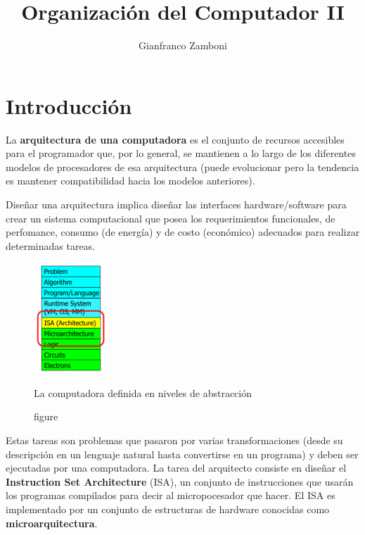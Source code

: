 



\title{Organización del Computador II}
\author{Gianfranco Zamboni}



\newcommand{\red}[1]{{\color{red}#1}}  			%


	\maketitle
	\tableofcontents

\newpage
\section{Introducción}

La \textbf{arquitectura de una computadora} es el conjunto de recursos accesibles para el programador que, por lo general, se mantienen a lo largo de los diferentes modelos de procesadores de esa arquitectura (puede evolucionar pero la tendencia es mantener compatibilidad hacia los modelos anteriores).

Diseñar una arquitectura implica diseñar las interfaces hardware/software para crear un sistema computacional que posea los requerimientos funcionales, de perfomance, consumo (de energía) y de costo (económico) adecuados para realizar determinadas tareas.

\begin{figure}
	\centering
	\includegraphics[width=0.25\textwidth]{imagenes/arquitectura}
	\caption{figure}{La computadora definida en niveles de abstracción}
	\label{fig:intro::arquitectura}
\end{figure}

Estas tareas son problemas que pasaron por varias transformaciones (desde su descripción en un lenguaje natural hasta convertirse en un programa) y deben ser ejecutadas por una computadora. La tarea del arquitecto consiste en diseñar el \textbf{Instruction Set Architecture} (ISA), un conjunto de instrucciones que usarán los programas compilados para decir al micropocesador que hacer. El ISA es implementado por un conjunto de estructuras de hardware conocidas como \textbf{microarquitectura}.

